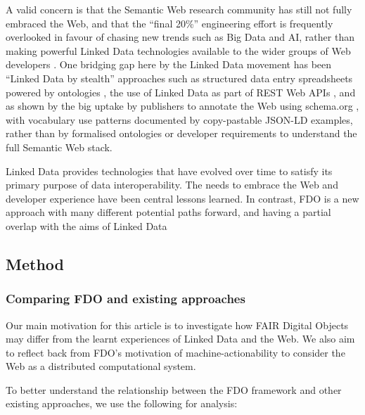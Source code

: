 A valid concern is that the Semantic Web research community has still not fully embraced the Web, and that the ``final 20\%'' engineering effort is frequently overlooked in favour of chasing new trends such as Big Data and AI, rather than making powerful Linked Data technologies available to the wider groups of Web developers \cite{verborghSemanticWebIdentity2020a}. One bridging gap here by the Linked Data movement has been ``Linked Data by stealth'' approaches such as structured data entry spreadsheets powered by ontologies \cite{wolstencroftRightFieldEmbeddingOntology2011b}, the use of Linked Data as part of REST Web APIs \cite{pageRESTLinkedData2011}, and as shown by the big uptake by publishers to annotate the Web using schema.org \cite{bernsteinNewLookSemantic2016a}, with vocabulary use patterns documented by copy-pastable JSON-LD examples, rather than by formalised ontologies or developer requirements to understand the full Semantic Web stack.

Linked Data provides technologies that have evolved over time to satisfy its primary purpose of data interoperability. The needs to embrace the Web and developer experience have been central lessons learned.  In contrast, FDO is a new approach with many different potential paths forward, and having a partial overlap with the aims of Linked Data

\subsection{Method}\label{ch3:method}

\subsubsection{Comparing FDO and existing approaches}\label{ch3:comparing}

Our main motivation for this article is to investigate how FAIR Digital Objects may differ from the learnt experiences of Linked Data and the Web. We also aim to reflect back from FDO's motivation of machine-actionability to consider the Web as a distributed computational system.

To better understand the relationship between the FDO framework and other existing approaches, we use the following for analysis:

